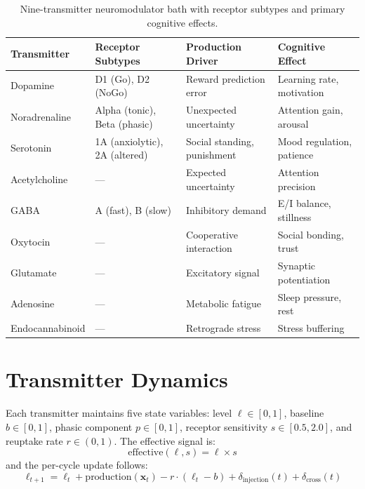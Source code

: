 \documentclass[12pt]{book}
\begin{document}
\begin{table}[H]
\centering
\caption{Nine-transmitter neuromodulator bath with receptor subtypes and primary cognitive effects.}
\label{tab:transmitters}
\begin{tabular}{llll}
\toprule
\textbf{Transmitter} & \textbf{Receptor Subtypes} & \textbf{Production Driver} & \textbf{Cognitive Effect} \\
\midrule
Dopamine & D1 (Go), D2 (NoGo) & Reward prediction error & Learning rate, motivation \\
Noradrenaline & Alpha (tonic), Beta (phasic) & Unexpected uncertainty & Attention gain, arousal \\
Serotonin & 1A (anxiolytic), 2A (altered) & Social standing, punishment & Mood regulation, patience \\
Acetylcholine & --- & Expected uncertainty & Attention precision \\
GABA & A (fast), B (slow) & Inhibitory demand & E/I balance, stillness \\
Oxytocin & --- & Cooperative interaction & Social bonding, trust \\
Glutamate & --- & Excitatory signal & Synaptic potentiation \\
Adenosine & --- & Metabolic fatigue & Sleep pressure, rest \\
Endocannabinoid & --- & Retrograde stress & Stress buffering \\
\bottomrule
\end{tabular}
\end{table}

\section{Transmitter Dynamics}

Each transmitter maintains five state variables: level $\ell \in [0,1]$, baseline $b \in [0,1]$, phasic component $p \in [0,1]$, receptor sensitivity $s \in [0.5, 2.0]$, and reuptake rate $r \in (0,1)$. The effective signal is:
\begin{equation}\label{eq:effective-signal}
\text{effective}(\ell, s) = \ell \times s
\end{equation}
and the per-cycle update follows:
\begin{equation}\label{eq:transmitter-update}
\ell_{t+1} = \ell_t + \text{production}(\mathbf{x}_t) - r \cdot (\ell_t - b) + \delta_{\text{injection}}(t) + \delta_{\text{cross}}(t)
\end{equation}
\end{document}
